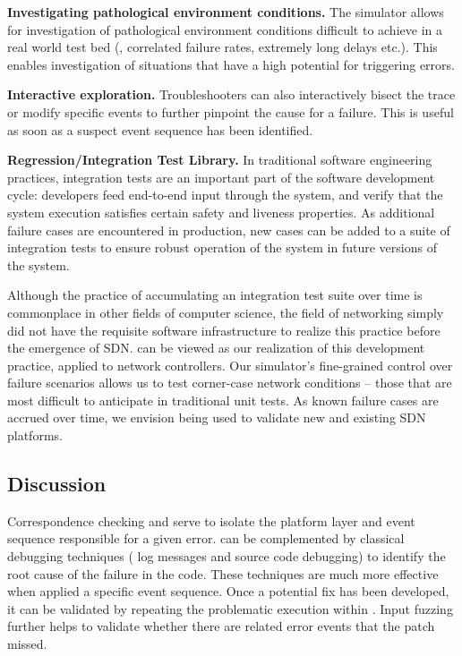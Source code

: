 {

\noindent\textbf{Investigating pathological environment conditions.} The simulator allows for investigation
of pathological environment conditions difficult to achieve in a real world test bed
(\eg{}, correlated failure rates, extremely long delays etc.). This enables
investigation of situations that have a high potential for triggering errors.

\noindent\textbf{Interactive exploration.} Troubleshooters can also interactively bisect
the trace or modify specific events to further pinpoint the cause for a failure.
This is useful as soon as a suspect event sequence has been identified.

\noindent\textbf{Regression/Integration Test Library.} In traditional software engineering practices,
integration tests are an
important part of the software development cycle: developers feed end-to-end
input through the system, and verify that the system execution satisfies
certain safety and liveness properties. As additional failure cases are encountered in
production, new cases can be added to a suite of integration tests to
ensure robust operation of the system in future versions of the system.

Although the practice of accumulating an integration test suite over time is
commonplace in other fields of computer science, the field of networking
simply did not have the requisite software infrastructure to realize this practice before the emergence
of SDN. \Simulator{} can be viewed as our realization
of this development practice, applied to network controllers. Our simulator's fine-grained control over
failure scenarios allows us to test corner-case network conditions -- those
that are most difficult to anticipate in traditional unit tests.
As known failure cases are accrued over time, we envision \simulator{} being used to validate
new and existing SDN platforms.

\subsection{Discussion}

Correspondence checking and \simulator{} serve to isolate the platform layer and
event sequence responsible for a given error. \projectname{} can be
complemented by classical debugging techniques (\eg{} log messages and source
code debugging) to identify the root cause of
the failure in the code. These techniques are much more
effective when applied a specific event sequence. Once a
potential fix has been developed, it can be validated by repeating the
problematic execution within \projectname{}. Input fuzzing further helps to
validate whether there are
related error events that the patch missed.

}
